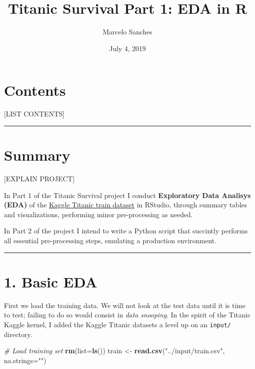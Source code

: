\documentclass[]{article}
\title{Titanic Survival Part 1: EDA in R}
\author{Marcelo Sanches}
\date{July 4, 2019}
\newenvironment{Shaded}{\begin{snugshade}}{\end{snugshade}}
\newcommand{\KeywordTok}[1]{\textcolor[rgb]{0.13,0.29,0.53}{\textbf{#1}}}
\newcommand{\DataTypeTok}[1]{\textcolor[rgb]{0.13,0.29,0.53}{#1}}
\newcommand{\StringTok}[1]{\textcolor[rgb]{0.31,0.60,0.02}{#1}}
\newcommand{\CommentTok}[1]{\textcolor[rgb]{0.56,0.35,0.01}{\textit{#1}}}
\newcommand{\NormalTok}[1]{#1}
\begin{document}
\maketitle

\section{Contents}\label{contents}

{[}LIST CONTENTS{]}

\begin{center}\rule{0.5\linewidth}{\linethickness}\end{center}

\section{Summary}\label{summary}

{[}EXPLAIN PROJECT{]}

In Part 1 of the Titanic Survival project I conduct \textbf{Exploratory
Data Analisys (EDA)} of the
\href{https://www.kaggle.com/c/titanic/data}{Kaggle Titanic train
dataset} in RStudio, through summary tables and visualizations,
performing minor pre-processing as needed.

In Part 2 of the project I intend to write a Python script that
succintly performs all essential pre-processing steps, emulating a
production environment.

\begin{center}\rule{0.5\linewidth}{\linethickness}\end{center}

\section{1. Basic EDA}\label{basic-eda}

First we load the training data. We will not look at the test data until
it is time to test; failing to do so would consist in \emph{data
snooping}. In the spirit of the Titanic Kaggle kernel, I added the
Kaggle Titanic datasets a level up on an \texttt{input/} directory.

\begin{Shaded}
\begin{Highlighting}[]
\CommentTok{# Load training set }
\KeywordTok{rm}\NormalTok{(}\DataTypeTok{list=}\KeywordTok{ls}\NormalTok{())}
\NormalTok{train <-}\StringTok{ }\KeywordTok{read.csv}\NormalTok{(}\StringTok{"../input/train.csv"}\NormalTok{, }\DataTypeTok{na.strings=}\StringTok{""}\NormalTok{)}
\end{Highlighting}
\end{Shaded}
\end{document}
